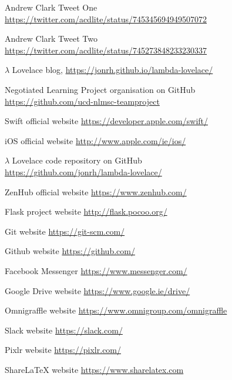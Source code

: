 \documentclass{article}
\begin{document}
% 
%
\begin{thebibliography}{9} 

    Andrew Clark Tweet One \\
    \url{https://twitter.com/acdlite/status/745345694949507072}
    
    Andrew Clark Tweet Two \\
    \url{https://twitter.com/acdlite/status/745273848233230337}
    
	$\lambda$ Lovelace blog, \url{https://jonrh.github.io/lambda-lovelace/}
	
	Negotiated Learning Project organisation on GitHub \\
	\url{https://github.com/ucd-nlmsc-teamproject}

	Swift official website \url{https://developer.apple.com/swift/}
	
	iOS official website \url{http://www.apple.com/ie/ios/}

	$\lambda$ Lovelace code repository on GitHub \\
	\url{https://github.com/jonrh/lambda-lovelace/}
	
	ZenHub official website \url{https://www.zenhub.com/}

    Flask project website \url{http://flask.pocoo.org/}
    
    Git website \url{https://git-scm.com/}

    Github website \url{https://github.com/}

    Facebook Messenger \url{https://www.messenger.com/}

    Google Drive website \url{https://www.google.ie/drive/}

    Omnigraffle website \url{https://www.omnigroup.com/omnigraffle}

    Slack website \url{https://slack.com/}
    
    Pixlr website \url{https://pixlr.com/}
     
    ShareLaTeX website \url{https://www.sharelatex.com}
    

\end{thebibliography}
\end{document}
